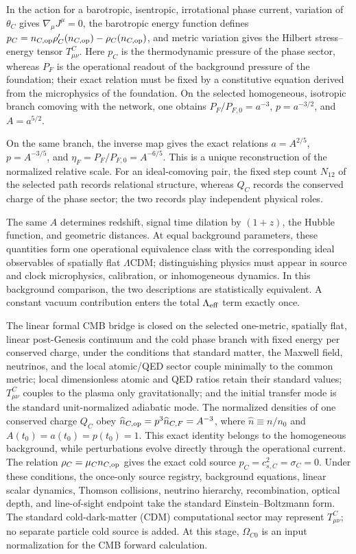 \documentclass[11pt,a4paper]{article}
\begin{document}
\begin{enumerate}[label=\arabic*.]
In the action for a barotropic, isentropic, irrotational phase current, variation of $\theta_C$ gives $\nabla_\mu J^\mu=0$, the barotropic energy function defines $p_C=n_{C,{\rm op}}\rho_C'(n_{C,{\rm op}})-\rho_C(n_{C,{\rm op}})$, and metric variation gives the Hilbert stress--energy tensor $T^C_{\mu\nu}$. Here $p_C$ is the thermodynamic pressure of the phase sector, whereas $P_F$ is the operational readout of the background pressure of the foundation; their exact relation must be fixed by a constitutive equation derived from the microphysics of the foundation. On the selected homogeneous, isotropic branch comoving with the network, one obtains $P_F/P_{F,0}=a^{-3}$, $p=a^{-3/2}$, and $A=a^{5/2}$.

On the same branch, the inverse map gives the exact relations $a=A^{2/5}$, $p=A^{-3/5}$, and $\eta_F=P_F/P_{F,0}=A^{-6/5}$. This is a unique reconstruction of the normalized relative scale. For an ideal-comoving pair, the fixed step count $N_{12}$ of the selected path records relational structure, whereas $Q_C$ records the conserved charge of the phase sector; the two records play independent physical roles.

The same $A$ determines redshift, signal time dilation by $(1+z)$, the Hubble function, and geometric distances. At equal background parameters, these quantities form one operational equivalence class with the corresponding ideal observables of spatially flat $\Lambda$CDM; distinguishing physics must appear in source and clock microphysics, calibration, or inhomogeneous dynamics. In this background comparison, the two descriptions are statistically equivalent. A constant vacuum contribution enters the total $\Lambda_{\rm eff}$ term exactly once.

The linear formal CMB bridge is closed on the selected one-metric, spatially flat, linear post-Genesis continuum and the cold phase branch with fixed energy per conserved charge, under the conditions that standard matter, the Maxwell field, neutrinos, and the local atomic/QED sector couple minimally to the common metric; local dimensionless atomic and QED ratios retain their standard values; $T^C_{\mu\nu}$ couples to the plasma only gravitationally; and the initial transfer mode is the standard unit-normalized adiabatic mode. The normalized densities of one conserved charge $Q_C$ obey $\widehat n_{C,{\rm op}}=p^3\widehat n_{C,F}=A^{-3}$, where $\widehat n\equiv n/n_0$ and $A(t_0)=a(t_0)=p(t_0)=1$. This exact identity belongs to the homogeneous background, while perturbations evolve directly through the operational current. The relation $\rho_C=\mu_Cn_{C,{\rm op}}$ gives the exact cold source $p_C=c_{s,C}^2=\sigma_C=0$. Under these conditions, the once-only source registry, background equations, linear scalar dynamics, Thomson collisions, neutrino hierarchy, recombination, optical depth, and line-of-sight endpoint take the standard Einstein--Boltzmann form. The standard cold-dark-matter (CDM) computational sector may represent $T^C_{\mu\nu}$; no separate particle cold source is added. At this stage, $\Omega_{C0}$ is an input normalization for the CMB forward calculation.


\end{enumerate}
\end{document}
